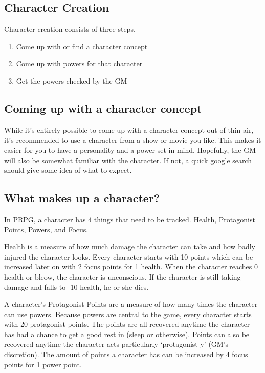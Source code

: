 \begin{flushleft}

\chapter{Character Creation} \label{character_creation}

Character creation consists of three steps.

\begin{enumerate}

    \item{Come up with or find a character concept}
    \item{Come up with powers for that character}
    \item{Get the powers checked by the GM}

\end{enumerate}

\section*{Coming up with a character concept}

While it's entirely possible to come up with a character concept out of thin
air, it's recommended to use a character from a show or movie you like. This
makes it easier for you to have a personality and a power set in mind.
Hopefully, the GM will also be somewhat familiar with the character. If
not, a quick google search should give some idea of what to expect.


\section*{What makes up a character?}

In PRPG, a character has 4 things that need to be tracked. Health, Protagonist
Points, Powers, and Focus.

Health is a measure of how much damage the character can take and how badly
injured the character looks. Every character starts with 10 points which can be
increased later on with 2 focus points for 1 health. When the character
reaches 0 health or bleow, the character is unconscious. If the character is
still taking damage and falls to -10 health, he or she dies.

A character's Protagonist Points are a measure of how many times the character
can use powers. Because powers are central to the game, every character starts
with 20 protagonist points. The points are all recovered anytime the character
has had a chance to get a good rest in (sleep or otherwise). Points can also be
recovered anytime the character acts particularly `protagonist-y' (GM's
discretion). The amount of points a character has can be increased by 4 focus
points for 1 power point.


\end{flushleft}
